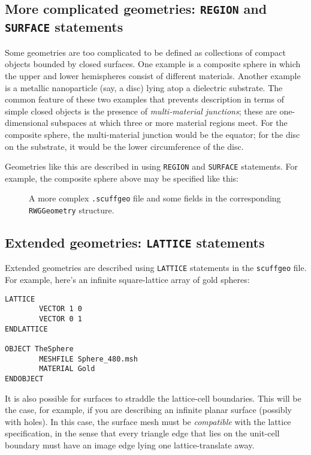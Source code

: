 \subsection*{More complicated geometries: \texttt{REGION}
             and \texttt{SURFACE} statements}

Some geometries are too complicated to be defined 
as collections of compact objects bounded by closed 
surfaces. One example is a composite sphere in which 
the upper and lower hemispheres consist of different 
materials. Another example is a metallic nanoparticle 
(say, a disc) lying atop a dielectric substrate. The 
common feature of these two examples that prevents 
description in terms of simple closed objects is the 
presence of \textit{multi-material junctions}; these
are one-dimensional subspaces at which three
or more material regions meet. 
For the composite sphere, the multi-material junction 
would be the equator; for the disc on the substrate, 
it would be the lower circumference of the disc.

Geometries like this are described in \lss
using \texttt{REGION} and \texttt{SURFACE}
statements. For example, the composite sphere
above may be specified like this:
\begin{figure}[H]
\begin{center}
\caption{A more complex \texttt{.scuffgeo} file and some fields in the 
         corresponding \texttt{RWGGeometry} structure.}
\end{center}
\end{figure}
\subsection*{Extended geometries: \texttt{LATTICE}
             statements}

Extended geometries are described using \texttt{LATTICE}
statements in the \texttt{scuffgeo} file.
For example, here's an infinite square-lattice array 
of gold spheres:
%
\begin{verbatim}
LATTICE
        VECTOR 1 0 
        VECTOR 0 1 
ENDLATTICE

OBJECT TheSphere
        MESHFILE Sphere_480.msh
        MATERIAL Gold
ENDOBJECT
\end{verbatim}
%

It is also possible for surfaces to straddle 
the lattice-cell boundaries. This will be the 
case, for example, if you are describing an
infinite planar surface (possibly with
holes). In this case, the surface mesh must
be \textit{compatible} with the lattice specification,
in the sense that every triangle edge that 
lies on the unit-cell boundary must have an
image edge lying one lattice-translate away.

